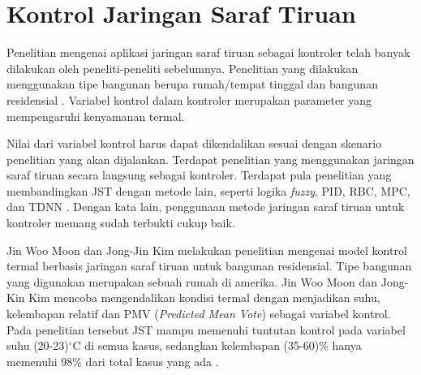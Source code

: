 \section{Kontrol Jaringan Saraf Tiruan}

Penelitian mengenai aplikasi jaringan saraf tiruan sebagai kontroler telah banyak dilakukan oleh peneliti-peneliti sebelumnya. Penelitian yang dilakukan menggunakan tipe bangunan berupa rumah/tempat tinggal \cite{paper22JJkim}\cite{paper22SKJung} dan bangunan residensial \cite{paper22JanDrgona}. Variabel kontrol dalam kontroler merupakan parameter yang mempengaruhi kenyamanan termal.

Nilai dari variabel kontrol harus dapat dikendalikan sesuai dengan skenario penelitian yang akan dijalankan. Terdapat penelitian yang menggunakan jaringan saraf tiruan secara langsung sebagai kontroler. Terdapat pula penelitian yang membandingkan JST dengan metode lain, seperti logika \textit{fuzzy}, PID, RBC, MPC, dan TDNN \cite{paper22JanDrgona}. Dengan kata lain, penggunaan metode jaringan saraf tiruan untuk kontroler memang sudah terbukti cukup baik.


Jin Woo Moon dan Jong-Jin Kim melakukan penelitian mengenai model kontrol termal berbasis jaringan saraf tiruan untuk bangunan residensial. Tipe bangunan yang digunakan merupakan sebuah rumah di amerika. Jin Woo Moon dan Jong-Kin Kim mencoba mengendalikan kondisi termal dengan menjadikan suhu, kelembapan relatif dan PMV (\textit{Predicted Mean Vote}) sebagai variabel kontrol. Pada penelitian tersebut JST mampu memenuhi tuntutan kontrol pada variabel suhu (20-23)$^\circ$C di semua kasus, sedangkan kelembapan (35-60)\% hanya memenuhi 98\% dari total kasus yang ada \cite{paper22JJkim}.

